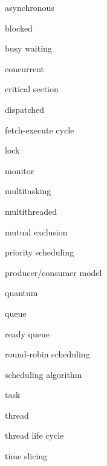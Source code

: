 \begin{KT}
asynchronous

blocked

busy waiting

concurrent

critical section

dispatched

fetch-execute cycle

lock

monitor

multitasking

multithreaded

mutual exclusion

priority scheduling

producer/consumer model

quantum

queue

ready queue

round-robin scheduling

scheduling algorithm 

task

thread

thread life cycle

time slicing

\end{KT}

